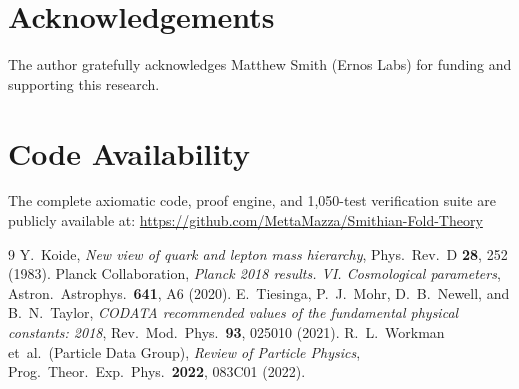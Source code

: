 \documentclass[11pt,a4paper]{article}
\begin{document}
\section*{Acknowledgements}
The author gratefully acknowledges Matthew Smith (Ernos Labs) for funding and supporting this research.

\section*{Code Availability}
The complete axiomatic code, proof engine, and 1,050-test verification suite are publicly available at:
\url{https://github.com/MettaMazza/Smithian-Fold-Theory}

\begin{thebibliography}{9}
 Y.~Koide, \textit{New view of quark and lepton mass hierarchy}, Phys.\ Rev.\ D \textbf{28}, 252 (1983).
 Planck Collaboration, \textit{Planck 2018 results. VI. Cosmological parameters}, Astron.\ Astrophys.\ \textbf{641}, A6 (2020).
 E.~Tiesinga, P.~J.~Mohr, D.~B.~Newell, and B.~N.~Taylor, \textit{CODATA recommended values of the fundamental physical constants: 2018}, Rev.\ Mod.\ Phys.\ \textbf{93}, 025010 (2021).
 R.~L.~Workman et~al.\ (Particle Data Group), \textit{Review of Particle Physics}, Prog.\ Theor.\ Exp.\ Phys.\ \textbf{2022}, 083C01 (2022).
\end{thebibliography}
\end{document}
